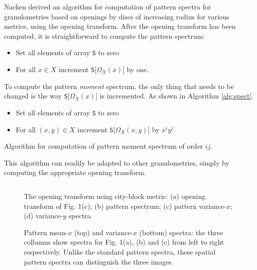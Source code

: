 \documentclass{sciposter}
\begin{document}
\begin{multicols}{3}
Nacken \cite{Nacken:thesis} derived an algorithm for computation
of pattern spectra for granulometries based on openings by discs of increasing
radius for various metrics, using the opening transform. After the
opening transform has been computed, it is straightforward to compute the
pattern spectrum:
\begin{itemize}
\item Set all elements of array {\tt S} to zero
\item For all $x \in X$ increment {\tt S}[$\Omega_X(x)$] by one.
\end{itemize}

To compute the pattern \emph{moment} spectrum, the only thing that needs to be
changed is the way {\tt S}[$\Omega_X(x)$] is incremented. As shown in Algorithm
\ref{alg:spect}.

\begin{algorithm}
\begin{itemize}
\item Set all elements of array {\tt S} to zero
\item For all $(x,y) \in X$ increment {\tt S}[$\Omega_X(x,y)$] by
$x^iy^j$.
\end{itemize}
\caption{ Algorithm for computation of pattern moment
spectrum of order $ij$. \label{alg:spect}}
\end{algorithm}

This algorithm can
readily be adapted to other granulometries, simply by computing the
appropriate opening transform.

\begin{figure}
\begin{center}
\begin{tabular}{c c}

\end{tabular}
\end{center}
\caption{ \label{fig:tauspect}
The opening transform using city-block metric: (a) opening transform of
Fig. 1(c); (b) pattern spectrum; (c) pattern variance-$x$;
(d) variance-$y$ spectra.}
\end{figure}


\renewcommand{\imsize}{0.3\columnwidth}
\begin{figure}
\begin{center}
\end{center}
\caption{ \label{fig:binspect} Pattern mean-$x$ (top) and variance-$x$
(bottom) spectra: the three collumns show spectra for Fig. 1(a), (b) and (c)
from left to right respectively.  Unlike the standard pattern spectra,
these spatial pattern spectra can distinguish the three images.}
\end{figure}


\end{multicols}
\end{document}
